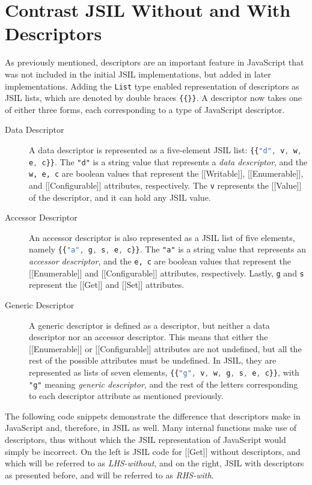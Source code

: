 \documentclass[a4paper,11pt,twoside]{report}
\def\jsinline{\lstinline[language=JavaScript, basicstyle=\small]}%\end{lstlisting}
\begin{document}
\section{Contrast JSIL Without and With Descriptors}
As previously mentioned, descriptors are an important feature in JavaScript that was not included in the initial JSIL implementations, but added in later implementations. Adding the \texttt{List} type enabled representation of descriptors as JSIL lists, which are denoted by double braces \texttt{\{\{\}\}}. A descriptor now takes one of either three forms, each corresponding to a type of JavaScript descriptor.
\begin{description}

\item[Data Descriptor] A data descriptor is represented as a five-element JSIL list: \jsinline|{{"d", v, w, e, c}}|. The \texttt{"d"} is a string value that represents a \textit{data descriptor}, and the \texttt{w, e, c} are boolean values that represent the [[Writable]], [[Enumerable]], and [[Configurable]] attributes, respectively. The \texttt{v} represents the [[Value]] of the descriptor, and it can hold any JSIL value.

\item[Accessor Descriptor] An accessor descriptor is also represented as a JSIL list of five elements, namely \jsinline|{{"a", g, s, e, c}}|. The \texttt{"a"} is a string value that represents an \textit{accessor descriptor}, and the \texttt{e, c} are boolean values that represent the [[Enumerable]] and [[Configurable]] attributes, respectively. Lastly, \texttt{g} and \texttt{s} represent the [[Get]] and [[Set]] attributes.

\item[Generic Descriptor] A generic descriptor is defined as a descriptor, but neither a data descriptor nor an accessor descriptor. This means that either the [[Enumerable]] or [[Configurable]] attributes are not undefined, but all the rest of the possible attributes must be undefined. In JSIL, they are represented as lists of seven elements, \jsinline|{{"g", v, w, g, s, e, c}}|, with \texttt{"g"} meaning \textit{generic descriptor}, and the rest of the letters corresponding to each descriptor attribute as mentioned previously.
\end{description}

The following code snippets demonstrate the difference that descriptors make in JavaScript and, therefore, in JSIL as well. Many internal functions make use of descriptors, thus without which the JSIL representation of JavaScript would simply be incorrect. On the left is JSIL code for [[Get]] without descriptors, and which will be referred to as \textit{LHS-without}, and on the right, JSIL with descriptors as presented before, and will be referred to as \textit{RHS-with}.
\end{document}
